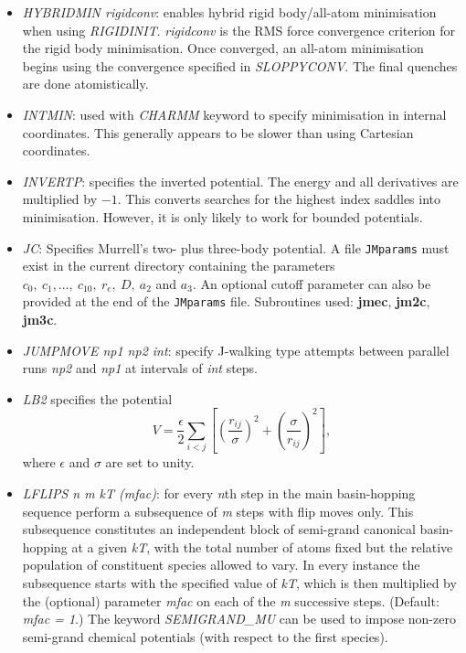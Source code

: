 \documentclass[12pt,a4paper,dvips]{article}
\begin{document}
\begin{itemize}
\item{\it HYBRIDMIN rigidconv\/}: enables hybrid rigid body/all-atom minimisation when using {\it RIGIDINIT}. {\it rigidconv} is
the RMS force convergence criterion for the rigid body minimisation. Once converged, an all-atom minimisation begins using the
convergence specified in {\it SLOPPYCONV}. The final quenches are done atomistically.

\item{\it INTMIN}: used with {\it CHARMM} keyword to specify minimisation in internal 
coordinates. This generally appears to be
slower than using Cartesian coordinates.

\item{\it INVERTP}: specifies the inverted potential. The energy and all derivatives
are multiplied by $-1$. 
This converts searches for the highest index saddles into minimisation. 
However, it is only likely to work for bounded potentials.

\item{\it JC}: Specifies Murrell's two- plus three-body
potential.\cite{murrellm90,murrellr90,alderzijmr91,eggenjlm92,fengjm93}
A file {\tt JMparams} must
exist in the current directory containing the parameters $c_0,\ c_1,\ldots,\ c_{10},\ r_e,\
D,\ a_2$ and $a_3$. An optional cutoff parameter can also be provided at the end of the
{\tt JMparams} file.
Subroutines used: {\bf jmec}, {\bf jm2c}, {\bf jm3c}.

\item {\it JUMPMOVE np1 np2 int\/}: specify J-walking type attempts between parallel runs {\it np2\/}
and {\it np1\/} at intervals of {\it int\/} steps.

\item {\it LB2} specifies the potential\cite{LB299a,LB299b,LB204}
\begin{equation}
V = \frac{\epsilon}{2} \sum_{i<j} \left[ \left(\frac{r_{ij}}{\sigma}\right)^2+
\left(\frac{\sigma}{r_{ij}}\right)^2 \right],
\end{equation}
where $\epsilon$ and $\sigma$ are set to unity.

\item {\it LFLIPS n m kT (mfac)\/}: for every {\it n}th step in the main basin-hopping sequence perform a subsequence of {\it m} steps with flip moves only. This subsequence constitutes an independent block of semi-grand canonical basin-hopping at a given {\it kT}, with the total number of atoms fixed but the relative population of constituent species allowed to vary. In every instance the subsequence starts with the specified value of {\it kT}, which is then multiplied by the (optional) parameter {\it mfac} on each of the {\it m} successive steps. (Default: {\it mfac = 1}.) The keyword {\it SEMIGRAND\_MU} can be used to impose non-zero semi-grand chemical potentials (with respect to the first species). 


\end{itemize}
\end{document}
